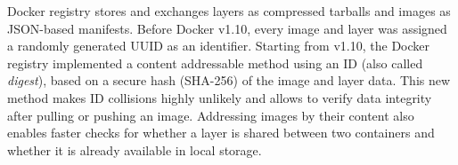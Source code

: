 Docker registry stores and exchanges layers as compressed tarballs and images
as JSON-based manifests.
%
Before Docker v1.10, every image and layer was assigned a randomly generated UUID
as an identifier.
%
%
Starting from v1.10, the Docker registry implemented a content addressable method
using an ID (also called \emph{digest}), based on a secure hash (SHA-256) of the
image and layer data.
%
%
This new method makes ID collisions highly unlikely and allows to verify data
integrity after pulling or pushing an image.
%
%
%
%
Addressing images by their content also enables faster checks for whether a
layer is shared between two containers and whether it is already available
in local storage.
%
%






